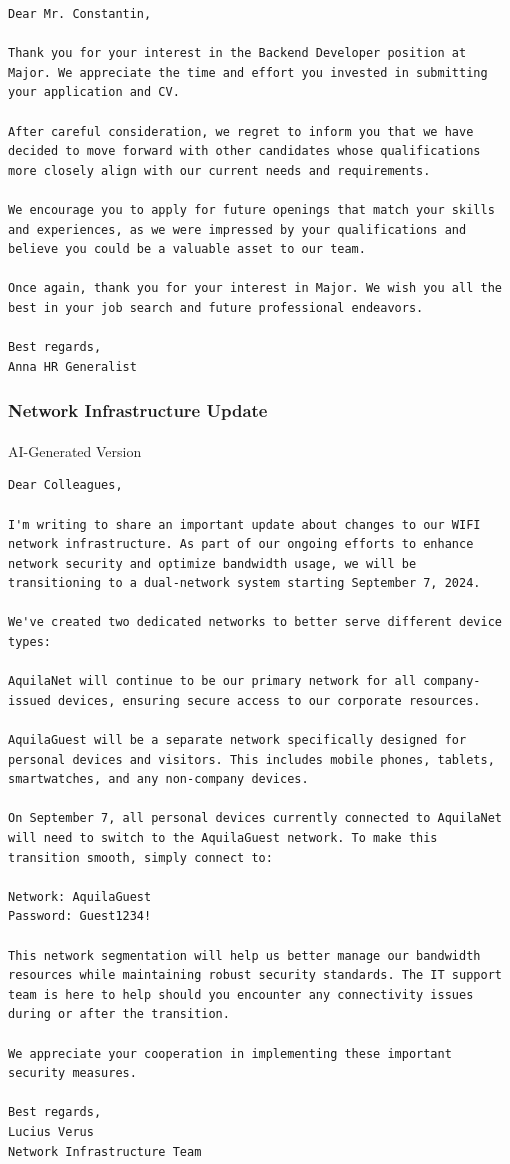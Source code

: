 \documentclass[
  letterpaper,
  DIV=11,
  numbers=noendperiod]{scrartcl}
\makeatletter
\let\oldparagraph\paragraph
\renewcommand{\paragraph}{
    \@ifstar
      \xxxParagraphStar
      \xxxParagraphNoStar
  }
\newcommand{\xxxParagraphStar}[1]{\oldparagraph*{#1}\mbox{}}
\newcommand{\xxxParagraphNoStar}[1]{\oldparagraph{#1}\mbox{}}
\makeatother
\begin{document}
\begin{verbatim}
Dear Mr. Constantin,

Thank you for your interest in the Backend Developer position at Major. We appreciate the time and effort you invested in submitting your application and CV.

After careful consideration, we regret to inform you that we have decided to move forward with other candidates whose qualifications more closely align with our current needs and requirements.

We encourage you to apply for future openings that match your skills and experiences, as we were impressed by your qualifications and believe you could be a valuable asset to our team.

Once again, thank you for your interest in Major. We wish you all the best in your job search and future professional endeavors.

Best regards,
Anna HR Generalist
\end{verbatim}

\subsubsection{Network Infrastructure
Update}\label{network-infrastructure-update}

\paragraph{AI-Generated Version}\label{ai-generated-version-3}

\begin{verbatim}
Dear Colleagues,

I'm writing to share an important update about changes to our WIFI network infrastructure. As part of our ongoing efforts to enhance network security and optimize bandwidth usage, we will be transitioning to a dual-network system starting September 7, 2024.

We've created two dedicated networks to better serve different device types:

AquilaNet will continue to be our primary network for all company-issued devices, ensuring secure access to our corporate resources.

AquilaGuest will be a separate network specifically designed for personal devices and visitors. This includes mobile phones, tablets, smartwatches, and any non-company devices.

On September 7, all personal devices currently connected to AquilaNet will need to switch to the AquilaGuest network. To make this transition smooth, simply connect to:

Network: AquilaGuest
Password: Guest1234!

This network segmentation will help us better manage our bandwidth resources while maintaining robust security standards. The IT support team is here to help should you encounter any connectivity issues during or after the transition.

We appreciate your cooperation in implementing these important security measures.

Best regards,
Lucius Verus
Network Infrastructure Team
\end{verbatim}
\end{document}
